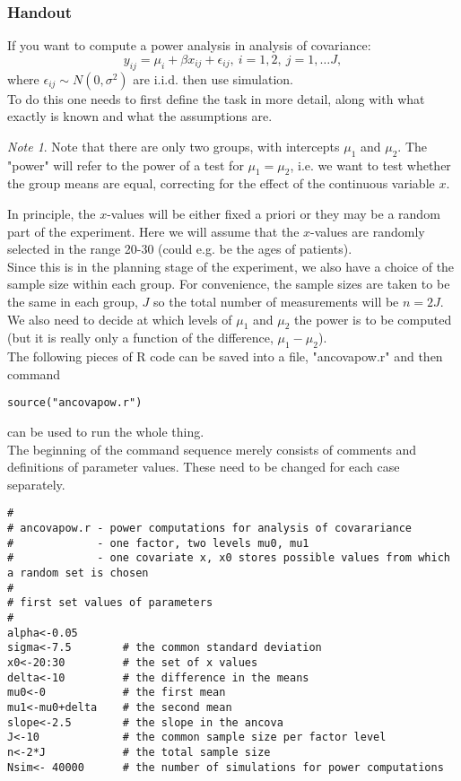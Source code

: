 \documentclass[12pt,a4paper]{article}
\theoremstyle{regla}
\theoremstyle{remark}
\newtheorem{notes}{Note}[section]
\theoremstyle{definition}
\theoremstyle{nonumberbreak}
\begin{document}
\subsubsection{Handout}
\begin{xmpl}
If you want to compute a power analysis in analysis of covariance:
$$
y_{ij}=\mu_i+\beta x_{ij}+\epsilon_{ij} , \ i=1, 2,\ j=1,\ldots J,
$$
where $\epsilon_{ij}\sim N(0,\sigma^ 2)$ are i.i.d. then use simulation. \\


To do this one needs to first define the task in more detail, along with what exactly is known and what the assumptions are. 

\begin{notes}
Note that there are only two groups, with intercepts $\mu_1$ and $\mu_2$.  The "power" will refer to the power of a test for $\mu_1=\mu_2$, 
i.e. we want to test whether the group means are equal, correcting for the effect of the continuous variable $x$.  
\end{notes}

In principle, the $x$-values will be either fixed a priori or they may be a random part of the experiment.  Here we will assume that the $x$-values are randomly selected in the range 20-30 (could e.g. be the ages of patients).\\

Since this is in the planning stage of the experiment, we also have a choice of the sample size within each group.  For convenience, the sample sizes are taken to be the same in each group, $J$ so the total number of measurements will be $n=2J$.  We also need to decide at which levels of $\mu_1$ and $\mu_2$ the power is to be computed (but it is really only a function of the difference, $\mu_1-\mu_2$).\\

The following pieces of R code can be saved into a file,  "ancovapow.r" and then command 
\begin{lstlisting}
source("ancovapow.r")
\end{lstlisting}
can be used to run the whole thing.\\

The beginning of the command sequence merely consists of comments and definitions of parameter values.  These need to be changed for each case separately.

\begin{lstlisting}
#
# ancovapow.r - power computations for analysis of covarariance
#             - one factor, two levels mu0, mu1
#             - one covariate x, x0 stores possible values from which a random set is chosen
#
# first set values of parameters
#
alpha<-0.05
sigma<-7.5        # the common standard deviation
x0<-20:30         # the set of x values
delta<-10         # the difference in the means
mu0<-0            # the first mean
mu1<-mu0+delta    # the second mean
slope<-2.5        # the slope in the ancova
J<-10             # the common sample size per factor level
n<-2*J            # the total sample size
Nsim<- 40000      # the number of simulations for power computations
\end{lstlisting}


\end{xmpl}
\end{document}
